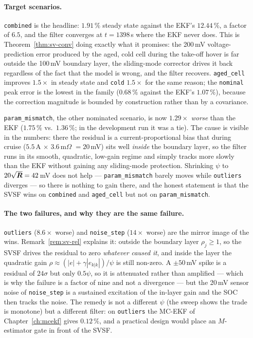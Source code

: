 \paragraph{Target scenarios.}  \texttt{combined} is the headline: $1.91\,\%$ steady state against
the EKF's $12.44\,\%$, a factor of $6.5$, and the filter converges at $t=1398$\,s where the EKF
never does.  This is Theorem~\ref{thm:sv-conv} doing exactly what it promises: the 200\,mV
voltage-prediction error produced by the aged, cold cell during the take-off hover is far outside
the 100\,mV boundary layer, the sliding-mode corrector drives it back regardless of the fact that
the model is wrong, and the filter recovers.  \texttt{aged\_cell} improves $1.5\times$ in steady
state and \texttt{cold} $1.5\times$ for the same reason; the \texttt{nominal} peak error is the
lowest in the family ($0.68\,\%$ against the EKF's $1.07\,\%$), because the correction magnitude is
bounded by construction rather than by a covariance.

\texttt{param\_mismatch}, the other nominated scenario, is now $1.29\times$ \emph{worse} than the
EKF ($1.75\,\%$ vs.\ $1.36\,\%$; in the development run it was a tie).  The cause is visible in the
numbers: there the residual is a current-proportional bias that during cruise
($5.5$\,A $\times$ $3.6$\,m\ensuremath{\Omega} $=20$\,mV) sits well \emph{inside} the boundary
layer, so the filter runs in its smooth, quadratic, low-gain regime and simply tracks more slowly
than the EKF without gaining any sliding-mode protection.  Shrinking $\psi$ to $20\sqrt{\bm{R}}=42$\,mV
does not help --- \texttt{param\_mismatch} barely moves while \texttt{outliers} diverges --- so
there is nothing to gain there, and the honest statement is that the SVSF wins on
\texttt{combined} and \texttt{aged\_cell} but not on \texttt{param\_mismatch}.

\paragraph{The two failures, and why they are the same failure.}  \texttt{outliers}
($8.6\times$ worse) and \texttt{noise\_step} ($14\times$ worse) are the mirror image of the wins.
Remark~\ref{rem:sv-rel} explains it: outside the boundary layer $\rho_j\ge1$, so the SVSF drives
the residual to zero \emph{whatever caused it}, and inside the layer the quadratic gain
$\rho\approx(|e|+\gamma|e_{k|k}|)/\psi$ is still non-zero.  A $\pm50$\,mV spike is a residual of
$24\sigma$ but only $0.5\psi$, so it is attenuated rather than amplified --- which is why the
failure is a factor of nine and not a divergence --- but the 20\,mV sensor noise of
\texttt{noise\_step} is a sustained excitation of the in-layer gain and the SOC then tracks the
noise.  The remedy is not a different $\psi$ (the sweep shows the trade is monotone) but a different
filter: on \texttt{outliers} the MC-EKF of Chapter~\ref{ch:mcekf} gives $0.12\,\%$, and a practical
design would place an $M$-estimator gate in front of the SVSF.

